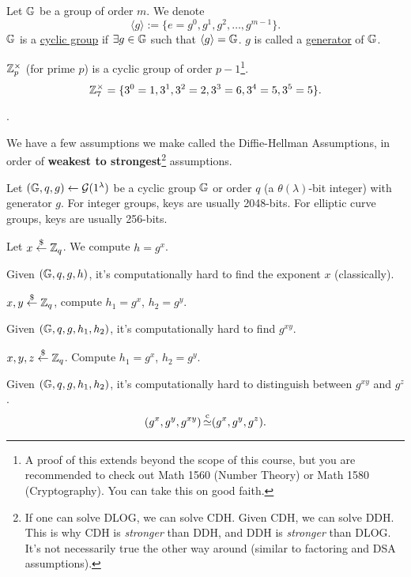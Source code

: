 \begin{definition}
    Let $\mathbb G$ be a group of order $m$. We denote
    \[\langle g\rangle := \{e=g^0, g^1, g^2, \dots, g^{m-1}\}.\]
    $\mathbb G$ is a \ul{cyclic group} if $\exists g\in \mathbb G$ such that $\langle g\rangle = \mathbb G$. $g$ is called a \ul{generator} of $\mathbb G$.
\end{definition}

\begin{example*}
    $\mathbb Z_p^\times$ (for prime $p$) is a cyclic group of order $p-1$\footnote{A proof of this extends beyond the scope of this course, but you are recommended to check out Math 1560 (Number Theory) or Math 1580 (Cryptography). You can take this on good faith. }.
    \[\mathbb Z_7^\times = \{3^0 = 1, 3^1, 3^2=2, 3^3 = 6, 3^4 = 5, 3^5 = 5\}.\]
\end{example*}
.

We have a few assumptions we make called the Diffie-Hellman Assumptions, in order of \textbf{weakest to strongest}\footnote{If one can solve DLOG, we can solve CDH. Given CDH, we can solve DDH. This is why CDH is \emph{stronger} than DDH, and DDH is \emph{stronger} than DLOG. It's not necessarily true the other way around (similar to factoring and DSA assumptions). } assumptions.

Let $(\mathbb G, q, g)\leftarrow \mathcal{G}(1^\lambda)$ be a cyclic group $\mathbb G$ or order $q$ (a $\theta(\lambda)$-bit integer) with generator $g$. For integer groups, keys are usually 2048-bits. For elliptic curve groups, keys are usually 256-bits.

\begin{definition}
    Let $x\overset{\$}{\leftarrow} \mathbb Z_q$. We compute $h = g^x$.

    Given $(\mathbb G, q, g, h)$, it's computationally hard to find the exponent $x$ (classically).
\end{definition}

\begin{definition}
    $x, y\overset{\$}{\leftarrow} \mathbb Z_q$, compute $h_1 = g^x$, $h_2 = g^y$.

    Given $(\mathbb G, q, g, h_1, h_2)$, it's computationally hard to find $g^{xy}$.
\end{definition}

\begin{definition}
    $x, y, z\overset{\$}{\leftarrow} \mathbb Z_q$. Compute $h_1 = g^x$, $h_2 = g^y$.

    Given $(\mathbb G, q, g, h_1, h_2)$, it's computationally hard to distinguish between $g^{xy}$ and $g^z$.
    \[(g^x, g^y, g^{xy}) \operatorname{\overset{c}{\simeq}} (g^x, g^y, g^z).\]
\end{definition}

